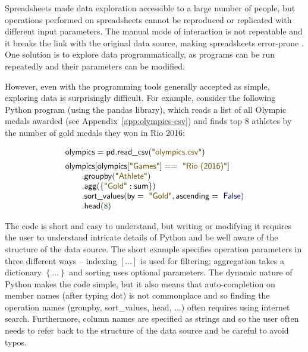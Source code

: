\documentclass[a4paper,UKenglish]{lipics-v2016}
\theoremstyle{plain}
\theoremstyle{definition}
\newcommand{\num}[1]{\textcolor{numclr}{#1}}
\newcommand{\str}[1]{\textnormal{\textcolor{strclr}{\sffamily "#1"}}}
\newcommand{\kvd}[1]{\textnormal{\textcolor{kvdclr}{\sffamily #1}}}
\newcommand{\ident}[1]{\textnormal{\sffamily #1}}
\begin{document}
Spreadsheets made data exploration accessible to a large number of people, but operations 
performed on spreadsheets cannot be reproduced or replicated with different input parameters.
The manual mode of interaction is not repeatable and it breaks the link with the original data 
source, making spreadsheets error-prone \cite{exceldep,sprerrors}. One solution is to explore data 
programmatically, as programs can be run repeatedly and their parameters can be modified.

However, even with the programming tools generally accepted as simple, exploring data is 
surprisingly difficult. For example, consider the following Python program (using the pandas
library), which reads a list of all Olympic medals awarded (see Appendix~\ref{app:olympics-csv}) 
and finds top 8 athletes by the number of gold medals they won in Rio 2016:

\noindent
\begin{equation*}
\begin{array}{l}
\ident{olympics} = \ident{pd.read\_csv}(\str{olympics.csv})\\[0.5em]
\ident{olympics}[\ident{olympics}[\str{Games}]==\str{Rio (2016)}]\\
\qquad .\ident{groupby}(\str{Athlete})\\
\qquad .\ident{agg}(\left\{\str{Gold}:\ident{sum}\right\})\\
\qquad .\ident{sort\_values}(\ident{by}=\str{Gold}, \ident{ascending}=\kvd{False})\\
\qquad .\ident{head}(\num{8})
\end{array}
\end{equation*}

\noindent
The code is short and easy to understand, but writing or modifying it requires the user to 
understand intricate details of Python and be well aware of the structure of the data source. 
The short example specifies operation parameters in three different ways -- indexing $[\ldots]$ 
is used for filtering; aggregation takes a dictionary $\left\{\ldots\right\}$ and sorting uses 
optional parameters. The dynamic nature of Python makes the code simple, but it also means that
auto-completion on member names (after typing dot) is not commonplace and so finding the operation
names (\ident{groupby}, \ident{sort\_values}, \ident{head}, ...) often requires using internet 
search. Furthermore, column names are specified as strings and so the user often needs to refer back
to the structure of the data source and be careful to avoid typos.
\end{document}
